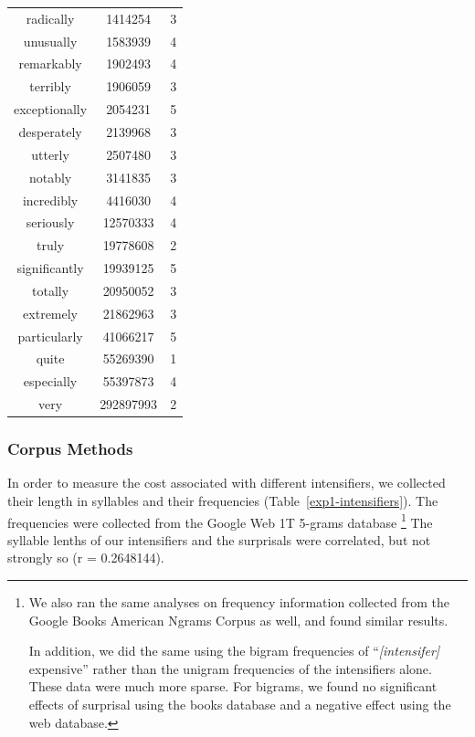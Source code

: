 \documentclass[10pt,letterpaper]{article}
\begin{document}
\begin{table}[ht]
\begin{center}
\begin{tabular}{ccc}
    radically & 1414254 & 3 \\
    unusually & 1583939 & 4 \\
    remarkably & 1902493 & 4 \\
    terribly & 1906059 & 3 \\
    exceptionally & 2054231 & 5 \\
    desperately & 2139968 & 3 \\
    utterly & 2507480 & 3 \\
    notably & 3141835 & 3 \\
    incredibly & 4416030 & 4 \\
    seriously & 12570333 & 4 \\
    truly & 19778608 & 2 \\
    significantly & 19939125 & 5 \\
    totally & 20950052 & 3 \\
    extremely & 21862963 & 3 \\
    particularly & 41066217 & 5 \\
    quite & 55269390 & 1 \\
    especially & 55397873 & 4 \\
    very & 292897993 & 2
  \end{tabular}
 \end{center}
\end{table}

\subsubsection{Corpus Methods}

In order to measure the cost associated with different intensifiers, we collected their length in syllables and their frequencies (Table~\ref{exp1-intensifiers}).
The frequencies were collected from the Google Web 1T 5-grams database \cite{web1t5gram}\footnote{
We also ran the same analyses on frequency information collected from the Google Books American Ngrams Corpus \cite{books2011} as well, and found similar results.

In addition, we did the same using the bigram frequencies of ``\emph{[intensifer]} expensive'' rather than the unigram frequencies of the intensifiers alone. These data were much more sparse. For bigrams, we found no significant effects of surprisal using the books database and a negative effect using the web database.
}
The syllable lenths of our intensifiers and the surprisals %
were correlated, but not strongly so (r = 0.2648144).
\end{document}
